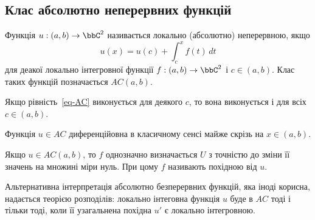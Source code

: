 
\subsection{Клас абсолютно неперервних функцій}

\begin{definition}
	Функція $u:(a,b)\to \bbC^2$ називається локально (абсолютно) неперервною, якщо
	\begin{equation} \label{eq-AC}
	 	u(x) = u(c) + \int_c^x{f(t)\,dt}
	\end{equation}
	для деакої локально інтегровної функції $f:(a,b)\to \bbC^2$ і $c\in(a,b)$. Клас таких функцій позначається $AC(a,b)$.
\end{definition}

Якщо рівність~\eqref{eq-AC} виконується для деякого $c$, то вона виконується і для всіх $c\in(a,b)$.

\begin{theorem}
	Функція $u\in AC$ диференційовна в класичному сенсі майже скрізь на $x\in (a,b)$.
\end{theorem}

Якщо $u\in AC(a,b)$, то $f$ однозначно визначається $U$ з точністю до зміни її значень на множині міри нуль. При цому $f$ називають похідною від $u$.

Альтернативна інтерпретація абсолютно безперервних функцій, яка іноді корисна, надається теорією розподілів: локально інтеговна функція $u$ буде в $AC$ тоді і тільки тоді, коли її узагальнена похідна $u'$ є локально інтегровною.